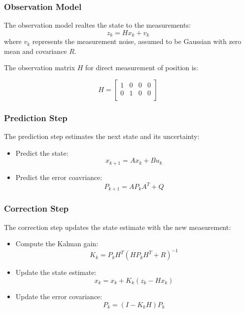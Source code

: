 \documentclass[aspectratio=169]{beamer}
\begin{document}
\begin{frame}
    \frametitle{Observation Model}
    The observation model realtes the state to the measurements:
    \begin{equation*}
        z_{k}=Hx_{k}+v_{k}
    \end{equation*}
    where \(v_{k}\) represents the measurement noise, assumed to be Gaussian with zero mean and
    covariance \(R\).

    The observation matrix \(H\) for direct measurement of position is:

    \begin{equation*}
        H = \begin{bmatrix}
            1 & 0 & 0 & 0 \\
            0 & 1 & 0 & 0 \\
        \end{bmatrix}
    \end{equation*}

\end{frame}

\begin{frame}
    \frametitle{Prediction Step}

    The prediction step estimates the next state and its uncertainty:

    \begin{itemize}
        \item Predict the state:
              \begin{equation}
                  x_{k+1}=Ax_{k} + Bu_{k}
              \end{equation}

        \item Predict the error coavriance:
              \begin{equation}
                  P_{k+1}=AP_{k}A^{T}+Q
              \end{equation}
    \end{itemize}
\end{frame}

\begin{frame}
    \frametitle{Correction Step}
    The correction step updates the state estimate with the new measurement:
    \begin{itemize}
        \item Compute the Kalman gain:
              \begin{equation}
                  K_{k} = P_{k}H^{T}(HP_{k}H^{T}+R)^{-1}
              \end{equation}
        \item Update the state estimate:
              \begin{equation}
                  x_{k} = x_{k}+K_{k}(z_{k}-Hx_{k})
              \end{equation}
        \item Update the error covariance:
              \begin{equation}
                  P_{k} = (I-K_{k}H)P_{k}
              \end{equation}
    \end{itemize}
\end{frame}
\end{document}
